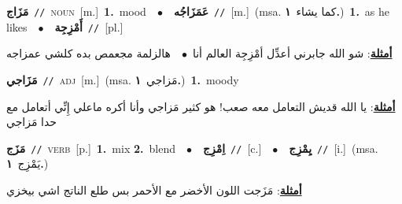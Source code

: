 \documentclass[10pt,a4paper,twoside]{article} %
\begin{document}
\begin{multicols}{2}
{\setlength\topsep{0pt}\textbf{\foreignlanguage{arabic}{مَزَاج}}\ {\color{gray}\texttt{//}\color{black}}\ \textsc{noun}\ [m.]\ \textbf{1.}~mood\ \ $\bullet$\ \ \setlength\topsep{0pt}\textbf{\foreignlanguage{arabic}{عَمَزَاجُه}}\ {\color{gray}\texttt{//}\color{black}}\ [m.]\ \color{gray}(msa. \foreignlanguage{arabic}{كما يشاء}~\foreignlanguage{arabic}{\textbf{١.}})\color{black}\ \textbf{1.}~as he likes\ \ $\bullet$\ \ \setlength\topsep{0pt}\textbf{\foreignlanguage{arabic}{أَمْزِجِة}}\ {\color{gray}\texttt{//}\color{black}}\ [pl.]\  \begin{flushright}\color{gray}\foreignlanguage{arabic}{\textbf{\underline{\foreignlanguage{arabic}{أمثلة}}}: شو الله جابرني أعدِّل أمْزِجِة العالم أنا\ $\bullet$\ \  هالزلمة مجعمص بده كلشي عمزاجه}\end{flushright}\color{black}} \vspace{2mm}

{\setlength\topsep{0pt}\textbf{\foreignlanguage{arabic}{مَزَاجي}}\ {\color{gray}\texttt{//}\color{black}}\ \textsc{adj}\ [m.]\ \color{gray}(msa. \foreignlanguage{arabic}{مَزاجي}~\foreignlanguage{arabic}{\textbf{١.}})\color{black}\ \textbf{1.}~moody\  \begin{flushright}\color{gray}\foreignlanguage{arabic}{\textbf{\underline{\foreignlanguage{arabic}{أمثلة}}}: يا الله قديش التعامل معه صعب! هو كثير مَزاجي وأنا أكره ماعلي إِنِّي أتعامل مع حدا مَزاجي}\end{flushright}\color{black}} \vspace{2mm}

{\setlength\topsep{0pt}\textbf{\foreignlanguage{arabic}{مَزَج}}\ {\color{gray}\texttt{//}\color{black}}\ \textsc{verb}\ [p.]\ \textbf{1.}~mix  \textbf{2.}~blend\ \ $\bullet$\ \ \setlength\topsep{0pt}\textbf{\foreignlanguage{arabic}{اِمْزِج}}\ {\color{gray}\texttt{//}\color{black}}\ [c.]\ \ $\bullet$\ \ \setlength\topsep{0pt}\textbf{\foreignlanguage{arabic}{يِمْزِج}}\ {\color{gray}\texttt{//}\color{black}}\ [i.]\ \color{gray}(msa. \foreignlanguage{arabic}{يَمْزِج}~\foreignlanguage{arabic}{\textbf{١.}})\color{black}\  \begin{flushright}\color{gray}\foreignlanguage{arabic}{\textbf{\underline{\foreignlanguage{arabic}{أمثلة}}}: مَزَجت اللون الأخضر مع الأحمر بس طلع الناتج اشي بيخزي}\end{flushright}\color{black}} \vspace{2mm}


\end{multicols}
\end{document}
